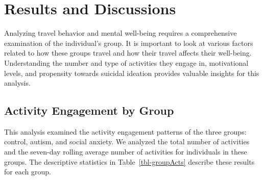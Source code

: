 \documentclass[
  letterpaper,
  number,
  review,
  3p]{elsarticle}
\begin{document}

\section{Results and Discussions}\label{results-and-discussions}

Analyzing travel behavior and mental well-being requires a comprehensive
examination of the individual's group. It is important to look at
various factors related to how these groups travel and how their travel
affects their well-being. Understanding the number and type of
activities they engage in, motivational levels, and propensity towards
suicidal ideation provides valuable insights for this analysis.

\subsection{Activity Engagement by
Group}\label{activity-engagement-by-group}

This analysis examined the activity engagement patterns of the three
groups: control, autism, and social anxiety. We analyzed the total
number of activities and the seven-day rolling average number of
activities for individuals in these groups. The descriptive statistics
in Table~\ref{tbl-groupActs} describe these results for each group.

\begin{table}

\caption{\label{tbl-groupActs}Activity Descriptive Statistics by Group}


\end{table}%
\end{document}
